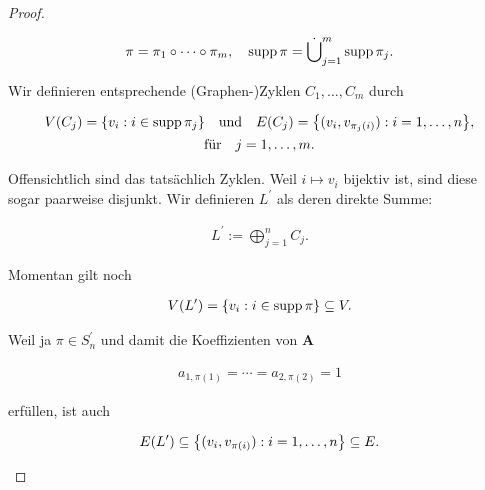 \begin{proof}
\begin{enumerate}[label = \arabic*.]
                    \begin{align*}
                        \pi = \pi_1 \circ \cdots \circ \pi_m,
                        \quad
                        \operatorname{supp} \pi = \dot \bigcup_{j=1}^m \operatorname{supp} \pi_j.
                    \end{align*}

                    Wir definieren entsprechende (Graphen-)Zyklen $C_1, \dots, C_m$ durch

                    \begin{multline*}
                        V(C_j) = {\left \{ v_i: i \in \operatorname{supp} \pi_j \right \}}
                        \quad
                        \text{und}
                        \quad
                        E(C_j) = {\left \{ (v_i, v_{\pi_j(i)}): i = 1, \dots, n \right \}}, \\
                        \text{für}
                        \quad
                        j = 1, \dots, m.
                    \end{multline*}

                    Offensichtlich sind das tatsächlich Zyklen.
                    Weil $i \mapsto v_i$ bijektiv ist, sind diese sogar paarweise disjunkt.
                    Wir definieren $L^\prime$ als deren direkte Summe:

                    \begin{align*}
                        L^\prime
                        :=
                        \bigoplus_{j=1}^n C_j.
                    \end{align*}

                    Momentan gilt noch

                    \begin{align} \label{eq:V_L_prime}
                        V(L^\prime)
                        =
                        {\left \{ v_i: i \in \operatorname{supp} \pi \right \}}
                        \subseteq
                        V.
                    \end{align}

                    Weil ja $\pi \in S_n^\prime$ und damit die Koeffizienten von $\mathbf A$

                    \begin{align*}
                        a_{1, \pi(1)} = \cdots = a_{2, \pi(2)} = 1
                    \end{align*}

                    erfüllen, ist auch

                    \begin{align} \label{eq:E_L_prime}
                        E(L^\prime)
                        \subseteq
                        {\left \{ (v_i, v_{\pi(i)}): i = 1, \dots, n \right \}}
                        \subseteq
                        E.
                    \end{align}


\end{enumerate}
\end{proof}
